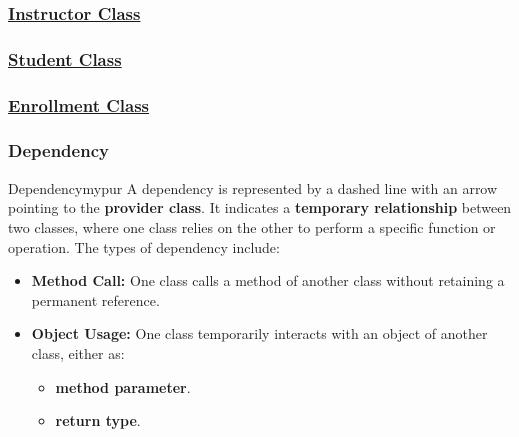 

\newpage
\subsubsection*{\underline{Instructor Class}}


\subsubsection*{\underline{Student Class}}



\subsubsection*{\underline{Enrollment Class}}


\subsubsection*{Dependency}

\begin{prettyBox}{Dependency}{mypur}
A dependency is represented by a dashed line with an arrow pointing to the \textbf{provider class}. It indicates a \textbf{temporary relationship} between two classes, where one class relies on the other to perform a specific function or operation. The types of dependency include:
\begin{itemize}
    \item \textbf{Method Call:} One class calls a method of another class without retaining a permanent reference.
    \item \textbf{Object Usage:} One class temporarily interacts with an object of another class, either as:
    \begin{itemize}
        \item \textbf{method parameter}.
        \item \textbf{return type}.
    \end{itemize}
\end{itemize}
\end{prettyBox}


